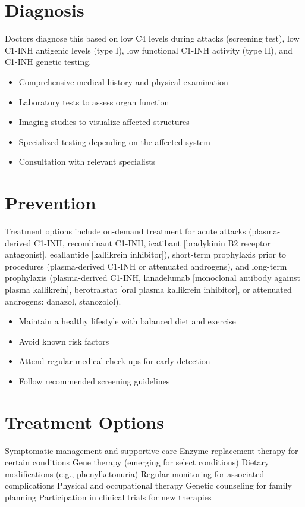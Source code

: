 \section{Diagnosis}
Doctors diagnose this based on low C4 levels during attacks (screening test), low C1-INH antigenic levels (type I), low functional C1-INH activity (type II), and C1-INH genetic testing.

\begin{itemize}[noitemsep]
  \item Comprehensive medical history and physical examination
  \item Laboratory tests to assess organ function
  \item Imaging studies to visualize affected structures
  \item Specialized testing depending on the affected system
  \item Consultation with relevant specialists
\end{itemize}
\section{Prevention}
Treatment options include on-demand treatment for acute attacks (plasma-derived C1-INH, recombinant C1-INH, icatibant [bradykinin B2 receptor antagonist], ecallantide [kallikrein inhibitor]), short-term prophylaxis prior to procedures (plasma-derived C1-INH or attenuated androgens), and long-term prophylaxis (plasma-derived C1-INH, lanadelumab [monoclonal antibody against plasma kallikrein], berotralstat [oral plasma kallikrein inhibitor], or attenuated androgens: danazol, stanozolol).

\begin{itemize}[noitemsep]
  \item Maintain a healthy lifestyle with balanced diet and exercise
  \item Avoid known risk factors
  \item Attend regular medical check-ups for early detection
  \item Follow recommended screening guidelines
\end{itemize}
\section{Treatment Options}
Symptomatic management and supportive care Enzyme replacement therapy for certain conditions Gene therapy (emerging for select conditions) Dietary modifications (e.g., phenylketonuria) Regular monitoring for associated complications Physical and occupational therapy Genetic counseling for family planning Participation in clinical trials for new therapies

